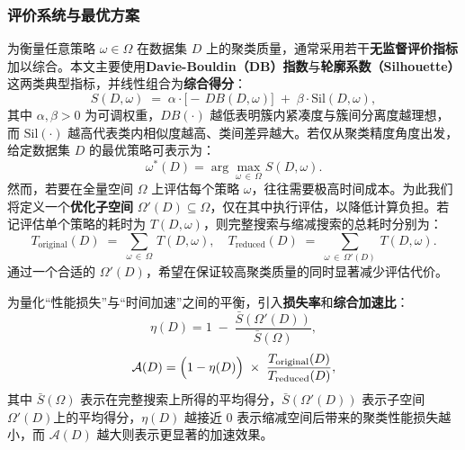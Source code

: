\documentclass[10pt]{article} %
\numberwithin{equation}{section}
\begin{document}
\subsubsection{评价系统与最优方案}
为衡量任意策略 \(\omega \in \Omega\) 在数据集 \(D\) 上的聚类质量，通常采用若干\textbf{无监督评价指标}加以综合。本文主要使用\textbf{Davie-Bouldin（DB）指数}与\textbf{轮廓系数（Silhouette）}这两类典型指标，并线性组合为\textbf{综合得分}：
\begin{equation}\label{eq:S-score}
  S(D,\omega)
  \;=\;
  \alpha \cdot \bigl[-\,DB(D,\omega)\bigr]
  \;+\;
  \beta \cdot \mathrm{Sil}(D,\omega),
\end{equation}
其中 \(\alpha,\beta > 0\) 为可调权重，\(DB(\cdot)\) 越低表明簇内紧凑度与簇间分离度越理想，而 \(\mathrm{Sil}(\cdot)\) 越高代表类内相似度越高、类间差异越大\cite{Atif2024,Sloutsky2012}。若仅从聚类精度角度出发，给定数据集 \(D\) 的最优策略可表示为：
\begin{equation}\label{eq:best strategy}
  \omega^*(D)
  = \arg\max_{\omega \,\in\, \Omega} S(D,\omega).
\end{equation}
然而，若要在全量空间 \(\Omega\) 上评估每个策略 \(\omega\)，往往需要极高时间成本。为此我们将定义一个\textbf{优化子空间} \(\Omega'(D)\subseteq \Omega\)，仅在其中执行评估，以降低计算负担。若记评估单个策略的耗时为 \(T(D,\omega)\)，则完整搜索与缩减搜索的总耗时分别为：
\begin{equation}\label{eq:T-original}
  T_{\text{original}}(D)
  \;=\;
  \sum_{\omega \,\in\, \Omega} \, T(D,\omega),
\quad
  T_{\text{reduced}}(D)
  \;=\;
  \sum_{\omega \,\in\, \Omega'(D)} \, T(D,\omega).
\end{equation}
通过一个合适的 \(\Omega'(D)\)，希望在保证较高聚类质量的同时显著减少评估代价。

为量化“性能损失”与“时间加速”之间的平衡，引入\textbf{损失率}和\textbf{综合加速比}：
\begin{equation}\label{eq:loss-rate}
  \eta(D)
  =
  1 \;-\;
  \frac{\bar{S}(\Omega'(D))}{\bar{S}(\Omega)},
\end{equation}
\begin{equation}\label{eq:acc-ratio}
  \mathcal{A}(D)
  =
  \Bigl(1 - \eta(D)\Bigr)
  \;\times\;
  \frac{T_{\text{original}}(D)}{T_{\text{reduced}}(D)},
\end{equation}
其中 \(\bar{S}(\Omega)\) 表示在完整搜索上所得的平均得分，\(\bar{S}(\Omega'(D))\) 表示子空间\(\Omega'(D)\)上的平均得分，\(\eta(D)\) 越接近 0 表示缩减空间后带来的聚类性能损失越小，而 \(\mathcal{A}(D)\) 越大则表示更显著的加速效果。
\end{document}
